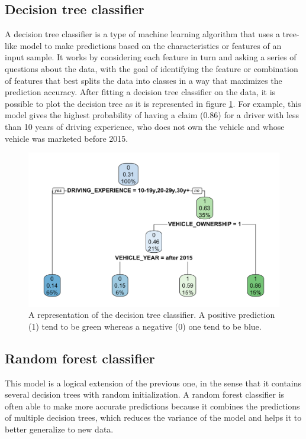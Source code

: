 \documentclass[a4paper,11pt, titlepage]{article}
\begin{document}
\subsection{Decision tree classifier}

A decision tree classifier is a type of machine learning algorithm that uses a tree-like model to make predictions based on the characteristics or features of an input sample. It works by considering each feature in turn and asking a series of questions about the data, with the goal of identifying the feature or combination of features that best splits the data into classes in a way that maximizes the prediction accuracy. After fitting a decision tree classifier on the data, it is possible to plot the decision tree as it is represented in figure \ref{fig:decision-tree}. For example, this model gives the highest probability of having a claim (0.86) for a driver with less than 10 years of driving experience, who does not own the vehicle and whose vehicle was marketed before 2015.

\begin{figure}[h!]
    \centering
    \includegraphics[width=\textwidth]{decision-tree-fit.png}
    \caption{A representation of the decision tree classifier. A positive prediction (1) tend to be green whereas a negative (0) one tend to be blue.}
    \label{fig:decision-tree}
\end{figure}

\subsection{Random forest classifier}

This model is a logical extension of the previous one, in the sense that it contains several decision trees with random initialization. A random forest classifier is often able to make more accurate predictions because it combines the predictions of multiple decision trees, which reduces the variance of the model and helps it to better generalize to new data. 
\end{document}
